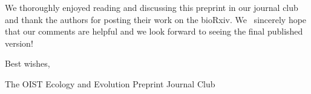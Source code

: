 \documentclass[10pt]{article}
\begin{document}
\par\null

We thoroughly enjoyed reading and discussing this preprint in our
journal club and thank the authors for posting their work on the
bioRxiv. We~ sincerely hope that our comments are helpful and we look
forward to seeing the final published version!

\par\null

Best wishes,

The OIST Ecology and Evolution Preprint Journal Club~

\par\null

\FloatBarrier
\end{document}
